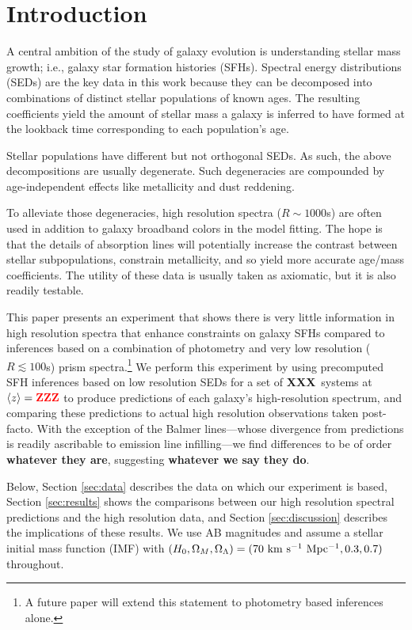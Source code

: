 \documentclass[a4paper,fleqn,usenatbib]{mnras}
\newcommand{\bfr}{\bf\color{red}}
\newcommand{\ntot}{{\bfr XXX}} %
\newcommand{\midz}{{\bfr ZZZ}} %
\begin{document}
\section{Introduction}
\label{sec:intro}

A central ambition of the study of galaxy evolution is understanding stellar mass growth; i.e., galaxy
star formation histories (SFHs). Spectral energy distributions (SEDs) are the key data in this work because 
they can be decomposed into combinations of distinct stellar populations of known ages. The resulting 
coefficients yield the amount of stellar mass a galaxy is inferred to have formed at the lookback time 
corresponding to each population's age.

Stellar populations have different but not orthogonal SEDs. As such, the above decompositions are 
usually degenerate. Such degeneracies are compounded by age-independent effects like metallicity and 
dust reddening. 

To alleviate those degeneracies, high resolution spectra ($R\sim1000$s) are often used in addition to 
galaxy broadband colors in the model fitting. The hope is that the details of absorption lines will potentially 
increase the contrast between stellar subpopulations, constrain metallicity, and so yield more accurate 
age/mass coefficients. The utility of these data is usually taken as axiomatic, but it is also readily testable. 

This paper presents an experiment that shows there is very little information in high resolution spectra
that enhance constraints on galaxy SFHs compared to inferences based on a combination of photometry and 
very low resolution ($R\lesssim100$s) prism spectra.\footnote{A future paper will extend this statement 
to photometry based inferences alone.} We perform this experiment by using precomputed SFH inferences
based on low resolution SEDs for a set of \ntot\ systems at $\langle z\rangle=\midz$ to produce predictions 
of each galaxy's high-resolution spectrum, and comparing these predictions to actual high resolution 
observations taken post-facto. With the exception of the Balmer lines---whose divergence from predictions 
is readily ascribable to emission line infilling---we find differences to be of order {\bfr whatever they are}, 
suggesting {\bfr whatever we say they do}.

Below, Section \ref{sec:data} describes the data on which our experiment is based, Section \ref{sec:results} 
shows the comparisons between our high resolution spectral predictions and the high resolution data, and
Section \ref{sec:discussion} describes the implications of these results. We use AB magnitudes and assume 
a \citet{Chabrier03} stellar initial mass function (IMF) with $(H_{0}, \Omega_{M}, \Omega_{\Lambda}) =
(70~{\rm km~s^{-1}~Mpc^{-1}}, 0.3, 0.7)$ throughout.
\end{document}
